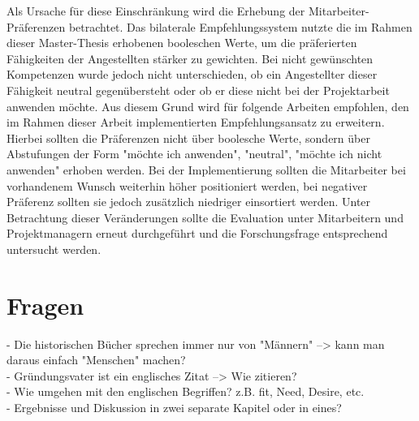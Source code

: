 Als Ursache für diese Einschränkung wird die Erhebung der Mitarbeiter-Präferenzen betrachtet. Das bilaterale Empfehlungssystem nutzte die im Rahmen dieser Master-Thesis erhobenen booleschen Werte, um die präferierten Fähigkeiten der Angestellten stärker zu gewichten. Bei nicht gewünschten Kompetenzen wurde jedoch nicht unterschieden, ob ein Angestellter dieser Fähigkeit neutral gegenübersteht oder ob er diese nicht bei der Projektarbeit anwenden möchte. Aus diesem Grund wird für folgende Arbeiten empfohlen, den im Rahmen dieser Arbeit implementierten Empfehlungsansatz zu erweitern. Hierbei sollten die Präferenzen nicht über boolesche Werte, sondern über Abstufungen der Form "möchte ich anwenden", "neutral", "möchte ich nicht anwenden" erhoben werden. Bei der Implementierung sollten die Mitarbeiter bei vorhandenem Wunsch weiterhin höher positioniert werden, bei negativer Präferenz sollten sie jedoch zusätzlich niedriger einsortiert werden. Unter Betrachtung dieser Veränderungen sollte die Evaluation unter Mitarbeitern und Projektmanagern erneut durchgeführt und die Forschungsfrage entsprechend untersucht werden.
\newpage

\section{Fragen}
\label{ch:fazit:fragen}
- Die historischen Bücher sprechen immer nur von "Männern" --> kann man daraus einfach "Menschen" machen?\\ 
- Gründungsvater ist ein englisches Zitat --> Wie zitieren?\\ 
- Wie umgehen mit den englischen Begriffen? z.B. fit, Need, Desire, etc. \\
- Ergebnisse und Diskussion in zwei separate Kapitel oder in eines?


